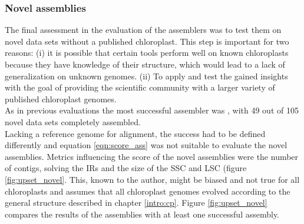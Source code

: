 \subsubsection{Novel assemblies}
 
The final assessment in the evaluation of the assemblers was to test them on novel data
sets without a published chloroplast. This step is important for two reasons: (i) it is
possible that certain tools perform well on known chloroplasts because they have knowledge
of their structure, which would lead to a lack of generalization on unknown genomes. (ii)
To apply and test the gained insights with the goal of providing
the scientific community with a larger variety of published chloroplast genomes.\\
As in previous evaluations the most successful assembler was \go, with 49 out of 105 novel data sets completely assembled. \\
Lacking a reference genome for alignment, the success had to be defined differently and
equation \ref{eqn:score_ass} was not suitable to evaluate the novel assemblies. Metrics
influencing the score of the novel assemblies were the number of contigs, solving the IRs
and the size of the SSC and LSC (figure \ref{fig:upset_novel}. This, known to the author, might be biased and not true
for all chloroplasts and assumes that all chloroplast genomes evolved according to the
general structure described in chapter \ref{intro:cp}. Figure \ref{fig:upset_novel}
compares the results of the assemblies with at least one successful assembly.

